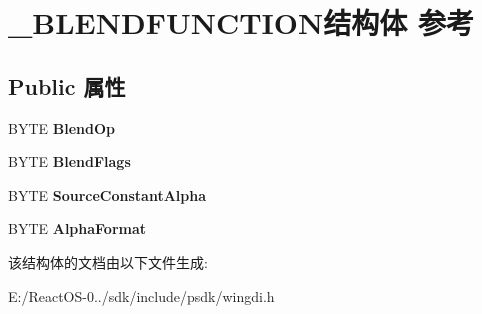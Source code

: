 \hypertarget{struct___b_l_e_n_d_f_u_n_c_t_i_o_n}{}\section{\+\_\+\+B\+L\+E\+N\+D\+F\+U\+N\+C\+T\+I\+O\+N结构体 参考}
\label{struct___b_l_e_n_d_f_u_n_c_t_i_o_n}
\subsection*{Public 属性}
\begin{DoxyCompactItemize}
\item 
\mbox{\label{struct___b_l_e_n_d_f_u_n_c_t_i_o_n_a206d386c61fcec240c9eac7c7a224238}} 
B\+Y\+TE {\bfseries Blend\+Op}
\item 
\mbox{\label{struct___b_l_e_n_d_f_u_n_c_t_i_o_n_a9980d168ac128ce9c7631a83a387b3bf}} 
B\+Y\+TE {\bfseries Blend\+Flags}
\item 
\mbox{\label{struct___b_l_e_n_d_f_u_n_c_t_i_o_n_ae686727ea94c611f50569f829ba753a4}} 
B\+Y\+TE {\bfseries Source\+Constant\+Alpha}
\item 
\mbox{\label{struct___b_l_e_n_d_f_u_n_c_t_i_o_n_ae36fd3118e67aa8a2a63c1d6fcbd2153}} 
B\+Y\+TE {\bfseries Alpha\+Format}
\end{DoxyCompactItemize}


该结构体的文档由以下文件生成\+:\begin{DoxyCompactItemize}
\item 
E\+:/\+React\+O\+S-\/0../sdk/include/psdk/wingdi.\+h\end{DoxyCompactItemize}
